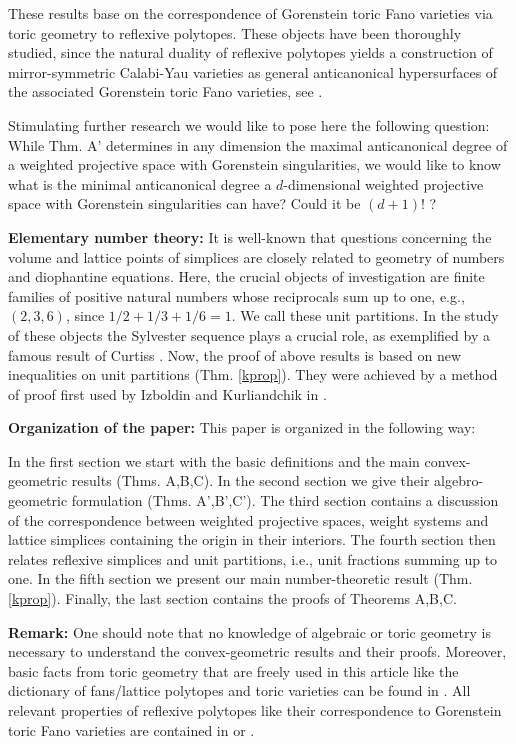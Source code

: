 \documentclass[a4paper,twoside]{article}
\begin{document}
These results base on the correspondence of Gorenstein toric Fano varieties via toric geometry to reflexive polytopes. 
These objects have been thoroughly studied, since the natural duality of reflexive polytopes yields a construction of mirror-symmetric Calabi-Yau varieties 
as general anticanonical hypersurfaces of the associated Gorenstein toric Fano varieties, see \cite{Bat94}.

Stimulating further research we would like to pose here the following question: While 
Thm. A' determines in any dimension the maximal anticanonical degree of a weighted projective space with Gorenstein singularities, 
we would like to know what is the minimal 
anticanonical degree a $d$-dimensional weighted projective space with Gorenstein singularities can have? Could it be $(d+1)!$ ?

\smallskip

\textbf{Elementary number theory:} 
It is well-known that questions concerning the volume and lattice points of simplices 
are closely related to geometry of numbers and diophantine equations. Here, the crucial objects of investigation are 
finite families of positive natural numbers whose reciprocals sum up to one,  e.g., $(2,3,6)$, since $1/2 + 1/3 + 1/6 = 1$. 
We call these unit partitions. In the study of these objects the Sylvester sequence plays a crucial role, as 
exemplified by a famous result of Curtiss \cite{Cur22}. Now, the proof of above results is based on new inequalities on unit partitions 
(Thm. \ref{kprop}). They were achieved by a method of proof first used by Izboldin and Kurliandchik in \cite{IK95}.

\smallskip

\textbf{Organization of the paper:} 
This paper is organized in the following way:

In the first section we start with the basic definitions and the main convex-geometric results (Thms. A,B,C). 
In the second section we give their algebro-geometric formulation (Thms. A',B',C'). 
The third section contains a discussion of the correspondence between 
weighted projective spaces, weight systems and lattice simplices containing the origin in their interiors. 
The fourth section then relates reflexive simplices and unit partitions, i.e., unit fractions summing up to one. 
In the fifth section we present our main number-theoretic result (Thm. \ref{kprop}). 
Finally, the last section contains the proofs of Theorems A,B,C.

\smallskip

\textbf{Remark:} One should note that no knowledge of algebraic or toric geometry is necessary to understand the convex-geometric 
results and their proofs. Moreover, basic facts from toric geometry that are freely used in this article 
like the dictionary of fans/lattice polytopes and toric varieties can be found 
in \cite{Ful93}. All relevant properties of reflexive polytopes like their correspondence to 
Gorenstein toric Fano varieties are contained in \cite{Bat94} or \cite{Nil05}. 
\end{document}

